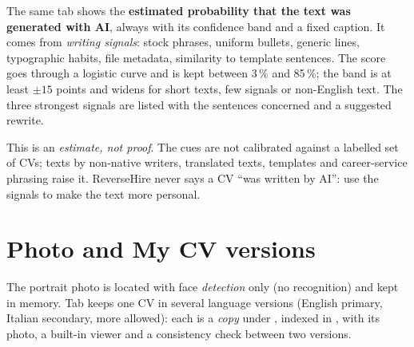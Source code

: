 The same tab shows the \textbf{estimated probability that the text was generated with AI}, always with its
confidence band and a fixed caption. It comes from \emph{writing signals}: stock phrases, uniform bullets,
generic lines, typographic habits, file metadata, similarity to template sentences. The score goes
through a logistic curve and is kept between 3\,\% and 85\,\%; the band is at least $\pm 15$ points and
widens for short texts, few signals or non-English text. The three strongest signals are listed with the
sentences concerned and a suggested rewrite.

\begin{warnbox}
This is an \emph{estimate, not proof}. The cues are not calibrated against a labelled set of CVs; texts by
non-native writers, translated texts, templates and career-service phrasing raise it. ReverseHire never says
a CV ``was written by AI'': use the signals to make the text more personal.
\end{warnbox}

\section{Photo and My CV versions}
The portrait photo is located with face \emph{detection} only (no recognition) and kept in memory. Tab
 keeps one CV in several language versions (English primary, Italian secondary, more allowed): each
is a \emph{copy} under , indexed in , with its photo, a
built-in viewer and a consistency check between two versions.
